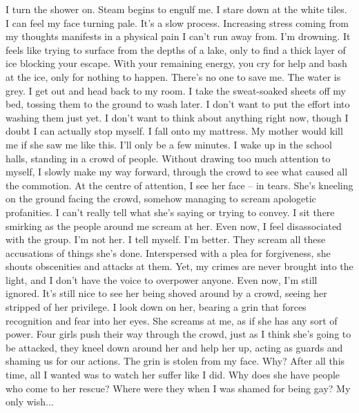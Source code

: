 \documentclass[a4paper, 12pt]{book}
\begin{document}
\begin{CJK*}{UTF8}{min}
\newline
\tab
I turn the shower on. Steam begins to engulf me. I stare down at the white tiles. I can feel my face turning pale. It’s a slow process. Increasing stress coming from my thoughts manifests in a physical pain I can’t run away from. I’m drowning. It feels like trying to surface from the depths of a lake, only to find a thick layer of ice blocking your escape. With your remaining energy, you cry for help and bash at the ice, only for nothing to happen. There’s no one to save me. The water is grey.
\newline
\tab
I get out and head back to my room. I take the sweat-soaked sheets off my bed, tossing them to the ground to wash later. I don’t want to put the effort into washing them just yet. I don’t want to think about anything right now, though I doubt I can actually stop myself. I fall onto my mattress. My mother would kill me if she saw me like this. I’ll only be a few minutes.
\newline
\tab
I wake up in the school halls, standing in a crowd of people. Without drawing too much attention to myself, I slowly make my way forward, through the crowd to see what caused all the commotion. At the centre of attention, I see her face -- in tears. She’s kneeling on the ground facing the crowd, somehow managing to scream apologetic profanities. I can’t really tell what she’s saying or trying to convey. I sit there smirking as the people around me scream at her. Even now, I feel disassociated with the group. I’m not her. I tell myself. I’m better. They scream all these accusations of things she’s done. Interspersed with a plea for forgiveness, she shouts obscenities and attacks at them. Yet, my crimes are never brought into the light, and I don’t have the voice to overpower anyone. Even now, I’m still ignored. It’s still nice to see her being shoved around by a crowd, seeing her stripped of her privilege. I look down on her, bearing a grin that forces recognition and fear into her eyes. She screams at me, as if she has any sort of power.
\newline
\tab
Four girls push their way through the crowd, just as I think she’s going to be attacked, they kneel down around her and help her up, acting as guards and shaming us for our actions. The grin is stolen from my face. Why? After all this time, all I wanted was to watch her suffer like I did. Why does she have people who come to her rescue? Where were they when I was shamed for being gay? My only wish...
\newline
\tab

\end{CJK*}
\end{document}

